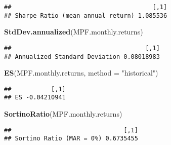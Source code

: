 \documentclass[
]{article}
\newenvironment{Shaded}{\begin{snugshade}}{\end{snugshade}}
\newcommand{\DataTypeTok}[1]{\textcolor[rgb]{0.13,0.29,0.53}{#1}}
\newcommand{\KeywordTok}[1]{\textcolor[rgb]{0.13,0.29,0.53}{\textbf{#1}}}
\newcommand{\NormalTok}[1]{#1}
\newcommand{\StringTok}[1]{\textcolor[rgb]{0.31,0.60,0.02}{#1}}
\begin{document}
\begin{verbatim}
##                                       [,1]
## Sharpe Ratio (mean annual return) 1.085536
\end{verbatim}

\begin{Shaded}
\begin{Highlighting}[]
\KeywordTok{StdDev.annualized}\NormalTok{(MPF.monthly.returns)}
\end{Highlighting}
\end{Shaded}

\begin{verbatim}
##                                     [,1]
## Annualized Standard Deviation 0.08018983
\end{verbatim}

\begin{Shaded}
\begin{Highlighting}[]
\KeywordTok{ES}\NormalTok{(MPF.monthly.returns, }\DataTypeTok{method =} \StringTok{"historical"}\NormalTok{)}
\end{Highlighting}
\end{Shaded}

\begin{verbatim}
##           [,1]
## ES -0.04210941
\end{verbatim}

\begin{Shaded}
\begin{Highlighting}[]
\KeywordTok{SortinoRatio}\NormalTok{(MPF.monthly.returns)}
\end{Highlighting}
\end{Shaded}

\begin{verbatim}
##                               [,1]
## Sortino Ratio (MAR = 0%) 0.6735455
\end{verbatim}
\end{document}
